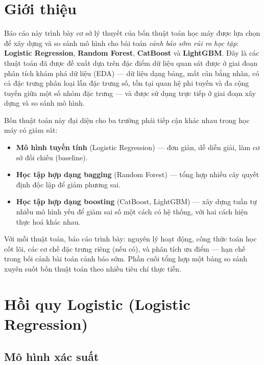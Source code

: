 \documentclass[a4paper]{article}
\begin{document}

\section{Giới thiệu}

Báo cáo này trình bày cơ sở lý thuyết của bốn thuật toán học máy được lựa chọn
để xây dựng và so sánh mô hình cho bài toán \textit{cảnh báo sớm rủi ro học
tập}: \textbf{Logistic Regression}, \textbf{Random Forest}, \textbf{CatBoost}
và \textbf{LightGBM}. Đây là các thuật toán đã được đề xuất dựa trên đặc điểm
dữ liệu quan sát được ở giai đoạn phân tích khám phá dữ liệu (EDA) --- dữ liệu
dạng bảng, mất cân bằng nhãn, có cả đặc trưng phân loại lẫn đặc trưng số, tồn
tại quan hệ phi tuyến và đa cộng tuyến giữa một số nhóm đặc trưng --- và được
sử dụng trực tiếp ở giai đoạn xây dựng và so sánh mô hình.

Bốn thuật toán này đại diện cho ba trường phái tiếp cận khác nhau trong học
máy có giám sát:

\begin{itemize}[leftmargin=*]
  \item \textbf{Mô hình tuyến tính} (Logistic Regression) --- đơn giản, dễ
        diễn giải, làm cơ sở đối chiếu (baseline).
  \item \textbf{Học tập hợp dạng bagging} (Random Forest) --- tổng hợp nhiều
        cây quyết định độc lập để giảm phương sai.
  \item \textbf{Học tập hợp dạng boosting} (CatBoost, LightGBM) --- xây dựng
        tuần tự nhiều mô hình yếu để giảm sai số một cách có hệ thống, với hai
        cách hiện thực hoá khác nhau.
\end{itemize}

Với mỗi thuật toán, báo cáo trình bày: nguyên lý hoạt động, công thức toán học
cốt lõi, các cơ chế đặc trưng riêng (nếu có), và phân tích ưu điểm --- hạn chế
trong bối cảnh bài toán cảnh báo sớm. Phần cuối tổng hợp một bảng so sánh
xuyên suốt bốn thuật toán theo nhiều tiêu chí thực tiễn.

\section{Hồi quy Logistic (Logistic Regression)}

\subsection{Mô hình xác suất}
\end{document}
